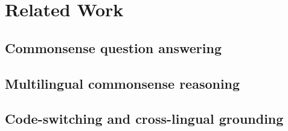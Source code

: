 \section{Related Work}
\label{sec:related-work}


\subsection{Commonsense question answering}

\subsection{Multilingual commonsense reasoning}

\subsection{Code-switching and cross-lingual grounding}

